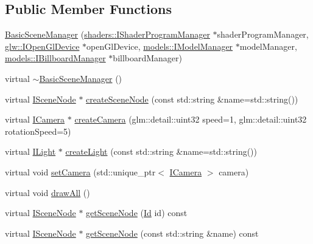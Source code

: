 \subsection*{Public Member Functions}
\begin{DoxyCompactItemize}
\item 
\hyperlink{classglr_1_1BasicSceneManager_af0d231684b65e772efafefbcc5ec4cc2}{Basic\-Scene\-Manager} (\hyperlink{classglr_1_1shaders_1_1IShaderProgramManager}{shaders\-::\-I\-Shader\-Program\-Manager} $\ast$shader\-Program\-Manager, \hyperlink{classglr_1_1glw_1_1IOpenGlDevice}{glw\-::\-I\-Open\-Gl\-Device} $\ast$open\-Gl\-Device, \hyperlink{classglr_1_1models_1_1IModelManager}{models\-::\-I\-Model\-Manager} $\ast$model\-Manager, \hyperlink{classglr_1_1models_1_1IBillboardManager}{models\-::\-I\-Billboard\-Manager} $\ast$billboard\-Manager)
\item 
virtual \hyperlink{classglr_1_1BasicSceneManager_af2a163b8e50ca2d26dad5f46a9c65439}{$\sim$\-Basic\-Scene\-Manager} ()
\item 
virtual \hyperlink{classglr_1_1ISceneNode}{I\-Scene\-Node} $\ast$ \hyperlink{classglr_1_1BasicSceneManager_abfafe5f2c6b9fe5511e028348eff6e9e}{create\-Scene\-Node} (const std\-::string \&name=std\-::string())
\item 
virtual \hyperlink{classglr_1_1ICamera}{I\-Camera} $\ast$ \hyperlink{classglr_1_1BasicSceneManager_a825c1a941bedb4f335c74db2160d85ca}{create\-Camera} (glm\-::detail\-::uint32 speed=1, glm\-::detail\-::uint32 rotation\-Speed=5)
\item 
virtual \hyperlink{classglr_1_1ILight}{I\-Light} $\ast$ \hyperlink{classglr_1_1BasicSceneManager_ad85d0f19b0ca0af22b8c83cae1e95e7b}{create\-Light} (const std\-::string \&name=std\-::string())
\item 
virtual void \hyperlink{classglr_1_1BasicSceneManager_a1717f0bfd7e19668ef6c2c626d280dcd}{set\-Camera} (std\-::unique\-\_\-ptr$<$ \hyperlink{classglr_1_1ICamera}{I\-Camera} $>$ camera)
\item 
virtual void \hyperlink{classglr_1_1BasicSceneManager_aa60bd57c95c1763d052f6ded3f84ca2e}{draw\-All} ()
\item 
virtual \hyperlink{classglr_1_1ISceneNode}{I\-Scene\-Node} $\ast$ \hyperlink{classglr_1_1BasicSceneManager_a1701af20f99bac8d2de4bc008ff45848}{get\-Scene\-Node} (\hyperlink{classglr_1_1Id}{Id} id) const 
\item 
virtual \hyperlink{classglr_1_1ISceneNode}{I\-Scene\-Node} $\ast$ \hyperlink{classglr_1_1BasicSceneManager_a9f82dc1736c7a1abdf5e55c5eeb6c425}{get\-Scene\-Node} (const std\-::string \&name) const 

\end{DoxyCompactItemize}
